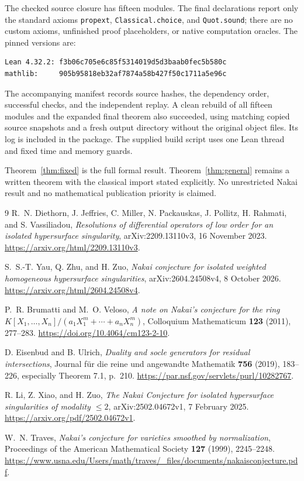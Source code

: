 \documentclass[11pt,letterpaper]{article}
\theoremstyle{remark}\newtheorem{remark}[theorem]{Remark}
\begin{document}
The checked source closure has fifteen modules. The final declarations report
only the standard axioms \texttt{propext}, \texttt{Classical.choice}, and
\texttt{Quot.sound}; there are no custom axioms, unfinished proof placeholders,
or native computation oracles. The pinned versions are:
\begin{lstlisting}
Lean 4.32.2: f3b06c705e6c85f5314019d5d3baab0fec5b580c
mathlib:     905b95818eb32af7874a58b427f50c1711a5e96c
\end{lstlisting}
The accompanying manifest records source hashes, the dependency order,
successful checks, and the independent replay. A clean rebuild of all fifteen
modules and the expanded final theorem also succeeded, using matching copied
source snapshots and a fresh output directory without the original object
files. Its log is included in the package. The supplied build
script uses one Lean thread and fixed time and memory guards.

Theorem~\ref{thm:fixed} is the full formal result. Theorem~\ref{thm:general}
remains a written theorem with the classical import stated explicitly.
No unrestricted Nakai result and no mathematical publication priority is
claimed.

\begin{thebibliography}{9}
R.~N. Diethorn, J. Jeffries, C. Miller, N. Packauskas, J. Pollitz,
H. Rahmati, and S. Vassiliadou,
\emph{Resolutions of differential operators of low order for an isolated
hypersurface singularity}, arXiv:2209.13110v3, 16 November 2023.
\url{https://arxiv.org/html/2209.13110v3}.

S.~S.-T. Yau, Q. Zhu, and H. Zuo,
\emph{Nakai conjecture for isolated weighted homogeneous hypersurface
singularities}, arXiv:2604.24508v4, 8 October 2026.
\url{https://arxiv.org/html/2604.24508v4}.

P.~R. Brumatti and M.~O. Veloso,
\emph{A note on Nakai's conjecture for the ring
$K[X_1,\ldots,X_n]/(a_1X_1^m+\cdots+a_nX_n^m)$},
Colloquium Mathematicum \textbf{123} (2011), 277--283.
\url{https://doi.org/10.4064/cm123-2-10}.

D. Eisenbud and B. Ulrich,
\emph{Duality and socle generators for residual intersections},
Journal f\"ur die reine und angewandte Mathematik \textbf{756} (2019),
183--226, especially Theorem 7.1, p.~210.
\url{https://par.nsf.gov/servlets/purl/10282767}.

R. Li, Z. Xiao, and H. Zuo,
\emph{The Nakai Conjecture for isolated hypersurface singularities of
modality $\le 2$}, arXiv:2502.04672v1, 7 February 2025.
\url{https://arxiv.org/pdf/2502.04672v1}.

W.~N. Traves,
\emph{Nakai's conjecture for varieties smoothed by normalization},
Proceedings of the American Mathematical Society \textbf{127} (1999),
2245--2248.
\url{https://www.usna.edu/Users/math/traves/_files/documents/nakaisconjecture.pdf}.
\end{thebibliography}
\end{document}
